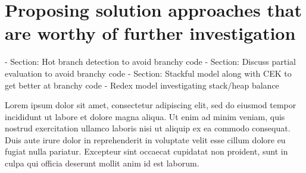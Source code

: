 \chapter{Proposing solution approaches that are worthy of further investigation}

	- Section: Hot branch detection to avoid branchy code
	- Section: Discuss partial evaluation to avoid branchy code
	- Section: Stackful model along with CEK to get better at branchy code
		- Redex model investigating stack/heap balance

Lorem ipsum dolor sit amet, consectetur adipiscing elit, sed do eiusmod tempor incididunt ut labore et dolore magna aliqua. Ut enim ad minim veniam, quis nostrud exercitation ullamco laboris nisi ut aliquip ex ea commodo consequat. Duis aute irure dolor in reprehenderit in voluptate velit esse cillum dolore eu fugiat nulla pariatur. Excepteur sint occaecat cupidatat non proident, sunt in culpa qui officia deserunt mollit anim id est laborum.
